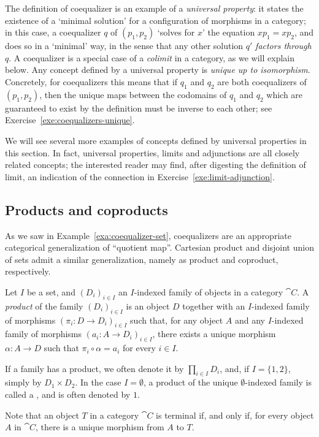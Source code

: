 The definition of coequalizer is an example of a \emph{universal property}: it states the existence of a `minimal solution' for a configuration of morphisms in a category; in this case, a coequalizer $q$ of $(p_1,p_2)$ `solves for $x$' the equation $xp_1 = xp_2$, and does so in a `minimal' way, in the sense that any other solution $q'$ \emph{factors through} $q$. A coequalizer is a special case of a \emph{colimit} in a category, as we will explain below. 
Any concept defined by a universal property is \emph{unique up to isomorphism}. Concretely, for coequalizers this means that if $q_1$ and $q_2$ are both coequalizers of $(p_1,p_2)$, then the unique maps between the codomains of $q_1$ and $q_2$ which are guaranteed to exist by the definition must be inverse to each other; see Exercise~\ref{exe:coequalizers-unique}.

We will see several more examples of concepts defined by universal properties in this section. In fact, universal properties, limits and adjunctions are all closely related concepts; the interested reader may find, after digesting the definition of limit, an indication of the connection in Exercise~\ref{exe:limit-adjunction}.


\subsection*{Products and coproducts}
As we saw in Example~\ref{exa:coequalizer-set}, coequalizers are an appropriate categorical generalization of ``quotient map''. Cartesian product and disjoint union of sets admit a similar generalization, namely as product and coproduct, respectively.
\begin{definition}\label{def:prod}
Let $I$ be a set, and $(D_i)_{i \in I}$ an $I$-indexed family of objects in a category $\cat{C}$. %
A \emph{product} of the family $(D_i)_{i \in I}$ is an object $D$ together with an $I$-indexed family of morphisms $(\pi_i \colon D \to D_i)_{i \in I}$ such that, for any object $A$ and any $I$-indexed family of morphisms $(a_i \colon A \to D_i)_{i \in I}$, there exists a unique morphism $\alpha \colon A \to D$ such that $\pi_i \circ \alpha = a_i$ for every $i \in I$.

If a family has a product, we often denote it by $\prod_{i \in I}D_i$, and, if $I = \{1, 2\}$, simply by $D_1 \times D_2$. In the case $I = \emptyset$, a product of the unique $\emptyset$-indexed family is called a , and is often denoted by $1$. 
\end{definition}
Note that an object $T$ in a category $\cat{C}$ is terminal if, and only if, for every object $A$ in $\cat{C}$, there is a unique morphism from $A$ to $T$.%


